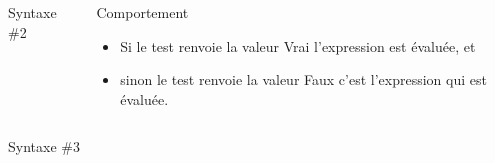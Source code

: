 \begin{frame}{}
  \begin{columns}
    \begin{column}{6cm}
      \begin{block}{Syntaxe \#2}
      \end{block}
    \end{column}
    \begin{column}{5cm}
      \begin{block}{Comportement}
        \begin{itemize}
        \item Si le test renvoie la valeur Vrai l'expression  est évaluée, et\\
        \item sinon le test renvoie la valeur Faux c'est l'expression  qui est évaluée.
        \end{itemize}
      \end{block}
    \end{column}
  \end{columns}
  \begin{columns}
    \begin{column}{6cm}
      \begin{block}{Syntaxe \#3}
\end{block}
\end{column}
\end{columns}
\end{frame}
